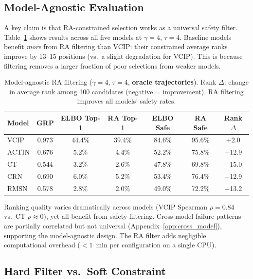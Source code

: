 \documentclass{article}
\begin{document}
\subsection{Model-Agnostic Evaluation}
\label{sec:model_agnostic}

A key claim is that RA-constrained selection works as a universal safety filter. Table~\ref{tab:model_agnostic} shows results across all five models at $\gamma = 4$, $\tau = 4$. Baseline models benefit \emph{more} from RA filtering than VCIP: their constrained average ranks improve by 13--15 positions (vs.\ a slight degradation for VCIP). This is because filtering removes a larger fraction of poor selections from weaker models.

\begin{table}[t]
\centering
\caption{Model-agnostic RA filtering ($\gamma = 4$, $\tau = 4$, \textbf{oracle trajectories}). Rank $\Delta$: change in average rank among 100 candidates (negative = improvement). RA filtering improves all models' safety rates.}
\label{tab:model_agnostic}
\small
\begin{tabular}{l c c c c c c}
\toprule
Model & GRP & ELBO Top-1 & RA Top-1 & ELBO Safe & RA Safe & Rank $\Delta$ \\
\midrule
VCIP  & 0.973 & 44.4\% & 39.4\% & 84.6\% & 95.6\% & $+$2.0 \\
ACTIN & 0.676 & 5.2\%  & 4.4\%  & 52.2\% & 75.8\% & $-$12.9 \\
CT    & 0.544 & 3.2\%  & 2.6\%  & 47.8\% & 69.8\% & $-$15.0 \\
CRN   & 0.690 & 6.0\%  & 5.2\%  & 53.4\% & 76.4\% & $-$12.9 \\
RMSN  & 0.578 & 2.8\%  & 2.0\%  & 49.0\% & 72.2\% & $-$13.2 \\
\bottomrule
\end{tabular}
\end{table}

Ranking quality varies dramatically across models (VCIP Spearman $\rho = 0.84$ vs.\ CT $\rho \approx 0$), yet all benefit from safety filtering. Cross-model failure patterns are partially correlated but not universal (Appendix~\ref{app:cross_model}), supporting the model-agnostic design. The RA filter adds negligible computational overhead ($< 1$~min per configuration on a single CPU).


\subsection{Hard Filter vs.\ Soft Constraint}
\label{sec:soft_vs_hard}
\end{document}
